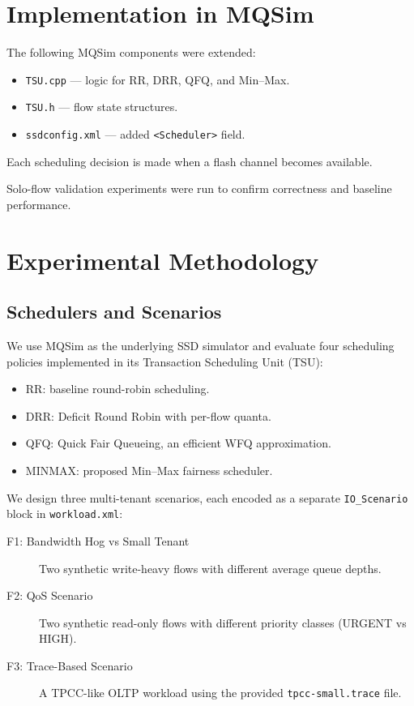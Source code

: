 \documentclass[11pt]{article}
\begin{document}
\section{Implementation in MQSim}



The following MQSim components were extended:
\begin{itemize}
    \item \texttt{TSU.cpp} --- logic for RR, DRR, QFQ, and Min--Max.
    \item \texttt{TSU.h} --- flow state structures.
    \item \texttt{ssdconfig.xml} --- added \texttt{<Scheduler>} field.
\end{itemize}

Each scheduling decision is made when a flash channel becomes available.

Solo-flow validation experiments were run to confirm correctness and baseline performance.

\section{Experimental Methodology}

\subsection{Schedulers and Scenarios}

We use MQSim as the underlying SSD simulator and evaluate four scheduling
policies implemented in its Transaction Scheduling Unit (TSU):
\begin{itemize}
    \item RR: baseline round-robin scheduling.
    \item DRR: Deficit Round Robin with per-flow quanta.
    \item QFQ: Quick Fair Queueing, an efficient WFQ approximation.
    \item MINMAX: proposed Min--Max fairness scheduler.
\end{itemize}

We design three multi-tenant scenarios, each encoded as a separate
\texttt{IO\_Scenario} block in \texttt{workload.xml}:

\begin{description}
    \item[F1: Bandwidth Hog vs Small Tenant] Two synthetic write-heavy flows
    with different average queue depths.
    \item[F2: QoS Scenario] Two synthetic read-only flows with different
    priority classes (URGENT vs HIGH).
    \item[F3: Trace-Based Scenario] A TPCC-like OLTP workload using the
    provided \texttt{tpcc-small.trace} file.
\end{description}
\end{document}
